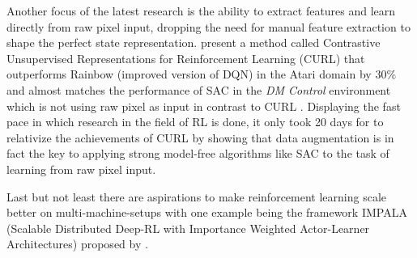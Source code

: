 Another focus of the latest research is the ability to extract features and learn directly from raw pixel input, dropping the need for manual feature extraction to shape the perfect state representation. \cite{srinivas2020curl} present a method called Contrastive Unsupervised Representations for Reinforcement Learning (CURL) that outperforms Rainbow (improved version of DQN) in the Atari domain by 30\% and almost matches the performance of SAC in the \textit{DM Control} environment which is not using raw pixel as input in contrast to CURL \cite[p.~7]{srinivas2020curl}. Displaying the fast pace in which research in the field of RL is done, it only took 20 days for \cite{kostrikov2021image} to relativize the achievements of CURL by showing that data augmentation is in fact the key to applying strong model-free algorithms like SAC to the task of learning from raw pixel input.
\par 
Last but not least there are aspirations to make reinforcement learning scale 
better on multi-machine-setups with one example being the framework IMPALA (Scalable Distributed Deep-RL with Importance Weighted
Actor-Learner Architectures) proposed by \cite{espeholt2018impala}.